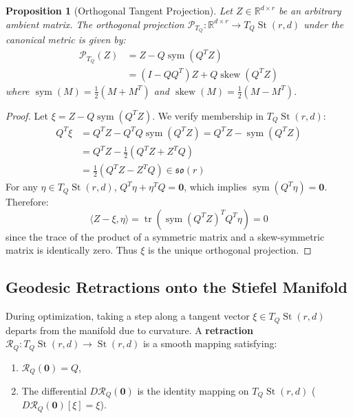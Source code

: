 \documentclass[10pt,twocolumn,letterpaper]{article}
\newtheorem{proposition}{Proposition}
\begin{document}
\begin{proposition}[Orthogonal Tangent Projection]
Let $Z \in \mathbb{R}^{d \times r}$ be an arbitrary ambient matrix. The orthogonal projection $\mathcal{P}_{T_Q}: \mathbb{R}^{d \times r} \to T_Q \operatorname{St}(r, d)$ under the canonical metric is given by:
\begin{align}
    \mathcal{P}_{T_Q}(Z) &= Z - Q \operatorname{sym}(Q^T Z) \nonumber \\
    &= (I - Q Q^T) Z + Q \operatorname{skew}(Q^T Z) \label{eq:tangent_proj}
\end{align}
where $\operatorname{sym}(M) = \frac{1}{2}(M + M^T)$ and $\operatorname{skew}(M) = \frac{1}{2}(M - M^T)$.
\end{proposition}

\begin{proof}
Let $\xi = Z - Q \operatorname{sym}(Q^T Z)$. We verify membership in $T_Q \operatorname{St}(r, d)$:
\begin{align}
    Q^T \xi &= Q^T Z - Q^T Q \operatorname{sym}(Q^T Z) = Q^T Z - \operatorname{sym}(Q^T Z) \nonumber \\
    &= Q^T Z - \frac{1}{2}(Q^T Z + Z^T Q) \nonumber \\
    &= \frac{1}{2}(Q^T Z - Z^T Q) \in \mathfrak{so}(r)
\end{align}
For any $\eta \in T_Q \operatorname{St}(r, d)$, $Q^T \eta + \eta^T Q = \mathbf{0}$, which implies $\operatorname{sym}(Q^T \eta) = \mathbf{0}$. Therefore:
\begin{equation}
    \langle Z - \xi, \eta \rangle = \operatorname{tr}\left( \operatorname{sym}(Q^T Z)^T Q^T \eta \right) = 0
\end{equation}
since the trace of the product of a symmetric matrix and a skew-symmetric matrix is identically zero. Thus $\xi$ is the unique orthogonal projection.
\end{proof}

\subsection{Geodesic Retractions onto the Stiefel Manifold}

During optimization, taking a step along a tangent vector $\xi \in T_Q \operatorname{St}(r, d)$ departs from the manifold due to curvature. A \textbf{retraction} $\mathcal{R}_Q: T_Q \operatorname{St}(r, d) \to \operatorname{St}(r, d)$ is a smooth mapping satisfying:
\begin{enumerate}
    \item $\mathcal{R}_Q(\mathbf{0}) = Q$,
    \item The differential $D \mathcal{R}_Q(\mathbf{0})$ is the identity mapping on $T_Q \operatorname{St}(r, d)$ ($D \mathcal{R}_Q(\mathbf{0})[\xi] = \xi$).
\end{enumerate}
\end{document}
